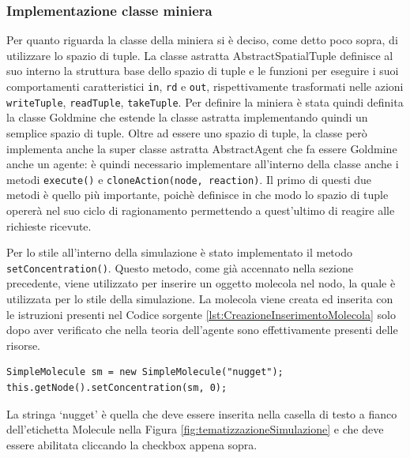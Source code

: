\subsubsection{Implementazione classe miniera}
Per quanto riguarda la classe della miniera si è deciso, come detto poco sopra, di utilizzare lo spazio di tuple. La classe astratta AbstractSpatialTuple definisce al suo interno la struttura base dello spazio di tuple e le funzioni per eseguire i suoi comportamenti caratteristici \texttt{in}, \texttt{rd} e \texttt{out}, rispettivamente trasformati nelle azioni \texttt{writeTuple}, \texttt{readTuple}, \texttt{takeTuple}.
Per definire la miniera è stata quindi definita la classe Goldmine che estende la classe astratta implementando quindi un semplice spazio di tuple.
Oltre ad essere uno spazio di tuple, la classe però implementa anche la super classe astratta AbstractAgent che fa essere Goldmine anche un agente: è quindi necessario implementare all'interno della classe anche i metodi \texttt{execute()} e \texttt{cloneAction(node, reaction)}. Il primo di questi due metodi è quello più importante, poichè definisce in che modo lo spazio di tuple opererà nel suo ciclo di ragionamento permettendo a quest'ultimo di reagire alle richieste ricevute.

Per lo stile all'interno della simulazione è stato implementato il metodo \texttt{setCon\-cen\-tra\-tion()}. Questo metodo, come già accennato nella sezione precedente, viene utilizzato per inserire un oggetto molecola nel nodo, la quale è utilizzata per lo stile della simulazione. La molecola viene creata ed inserita con le istruzioni presenti nel Codice sorgente \ref{lst:CreazioneInserimentoMolecola} solo dopo aver verificato che nella teoria dell'agente sono effettivamente presenti delle risorse.

\switchToJava{}{}
\begin{lstlisting}[float,firstnumber=1,label={lst:CreazioneInserimentoMolecola},caption={Creazione e inserimento molecola}]
SimpleMolecule sm = new SimpleMolecule("nugget");
this.getNode().setConcentration(sm, 0);
\end{lstlisting}
La stringa `nugget' è quella che deve essere inserita nella casella di testo a fianco dell'etichetta Molecule nella Figura \ref{fig:tematizzazioneSimulazione} e che deve essere abilitata cliccando la checkbox appena sopra.

\paragraph*{}

